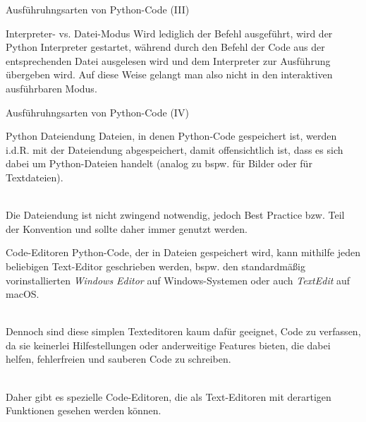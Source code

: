   \begin{frame}{Ausführuhngsarten von Python-Code (III)}
      \begin{alertblock}{Interpreter- vs. Datei-Modus}
        Wird lediglich der Befehl  ausgeführt, wird der Python Interpreter gestartet, während durch den Befehl  der Code aus der entsprechenden Datei ausgelesen wird und dem Interpreter zur Ausführung übergeben wird. Auf diese Weise gelangt man also nicht in den interaktiven ausführbaren Modus.
      \end{alertblock}
  \end{frame}
  
    \begin{frame}{Ausführuhngsarten von Python-Code (IV)}
      \begin{block}{Python Dateiendung}
        Dateien, in denen Python-Code gespeichert ist, werden i.d.R. mit der Dateiendung  abgespeichert, damit offensichtlich ist, dass es sich dabei um Python-Dateien handelt (analog zu bspw.  für Bilder oder  für Textdateien). \\~\
        
        Die Dateiendung  ist nicht zwingend notwendig, jedoch Best Practice bzw. Teil der Konvention und sollte daher immer genutzt werden.
      \end{block}
  \end{frame}
  
  \begin{frame}{Code-Editoren}
      Python-Code, der in Dateien gespeichert wird, kann mithilfe jeden beliebigen Text-Editor geschrieben werden, bspw. den standardmäßig vorinstallierten \textit{Windows Editor} auf Windows-Systemen oder auch \textit{TextEdit} auf macOS.\\~\
      
      Dennoch sind diese simplen Texteditoren kaum dafür geeignet, Code zu verfassen, da sie keinerlei Hilfestellungen oder anderweitige Features bieten, die dabei helfen, fehlerfreien und sauberen Code zu schreiben. \\~\
      
      Daher gibt es spezielle Code-Editoren, die als Text-Editoren mit derartigen Funktionen gesehen werden können.
  \end{frame}
  
